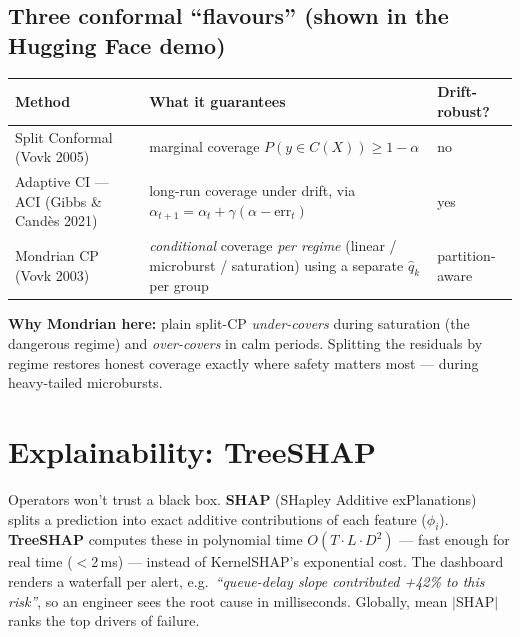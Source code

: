\documentclass[11pt,a4paper]{article}
\begin{document}
\subsection{Three conformal ``flavours'' (shown in the Hugging Face demo)}
\begin{center}
\begin{tabularx}{\linewidth}{@{}p{3.5cm}Xp{2.4cm}@{}}
\toprule
\textbf{Method} & \textbf{What it guarantees} & \textbf{Drift-robust?} \\
\midrule
Split Conformal (Vovk 2005) & marginal coverage $P(y\in C(X))\geq1-\alpha$ & no \\
Adaptive CI --- ACI (Gibbs \& Cand\`es 2021) & long-run coverage under drift, via $\alpha_{t+1}=\alpha_t+\gamma(\alpha-\text{err}_t)$ & yes \\
Mondrian CP (Vovk 2003) & \emph{conditional} coverage \emph{per regime} (linear / microburst / saturation) using a separate $\hat q_k$ per group & partition-aware \\
\bottomrule
\end{tabularx}
\end{center}
\textbf{Why Mondrian here:} plain split-CP \emph{under-covers} during saturation (the dangerous regime) and
\emph{over-covers} in calm periods. Splitting the residuals by regime restores honest coverage exactly where
safety matters most --- during heavy-tailed microbursts.

\section{Explainability: TreeSHAP}
Operators won't trust a black box. \textbf{SHAP} (SHapley Additive exPlanations) splits a prediction into
exact additive contributions of each feature ($\phi_i$). \textbf{TreeSHAP} computes these in polynomial time
$O(T\cdot L\cdot D^2)$ --- fast enough for real time ($<$2\,ms) --- instead of KernelSHAP's exponential cost.
The dashboard renders a waterfall per alert, e.g.\ \emph{``queue-delay slope contributed +42\% to this
risk''}, so an engineer sees the root cause in milliseconds. Globally, mean $|$SHAP$|$ ranks the top drivers
of failure.

\end{document}
